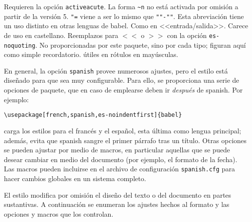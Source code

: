 \begin{table}[!t]
 \vspace{1.5ex}

 \begin{minipage}{11cm}
 \footnotesize
  Requieren la opción \verb|activeacute|.
  La forma \verb|~n| no está activada por omisión a partir de 
 la versión 5.
  \verb|"=| viene a ser lo mismo que \verb|""-""|.
  Esta abreviación tiene un uso distinto
 en otras lenguas de babel.
  Como en <<entrada/salida>>.
  Carece de uso en castellano.
  Reemplazos para $<<$ o $>>$ con la opción \verb|es-noquoting|. 
  No proporcionadas por este paquete, sino por cada tipo;
 figuran aquí como simple recordatorio.
  útiles en rótulos en mayúsculas.
 \end{minipage}
 \end{table}


En general, la opción \verb|spanish| provee numerosos ajustes, pero el estilo está diseñado para que sea muy configurable. Para ello, se proporciona una serie de opciones de paquete, que en caso de emplearse deben ir \textit{después} de \textsf{spanish}.  Por ejemplo:
\begin{verbatim}
\usepackage[french,spanish,es-noindentfirst]{babel} 
\end{verbatim}
carga los estilos para el francés y el español, esta última como lengua principal; además, evita que \textsf{spanish} sangre el primer párrafo tras un título.  Otras opciones se pueden ajustar por medio de macros, en particular aquellas que se puede desear cambiar en medio del documento (por ejemplo, el formato de la fecha). Las macros pueden incluirse en el archivo de configuración \verb|spanish.cfg| para hacer cambios globales en un sistema completo.

El estilo modifica por omisión el diseño del texto o del documento en partes sustantivas. A continuación se enumeran los ajustes hechos al formato y las opciones y macros que los controlan.


